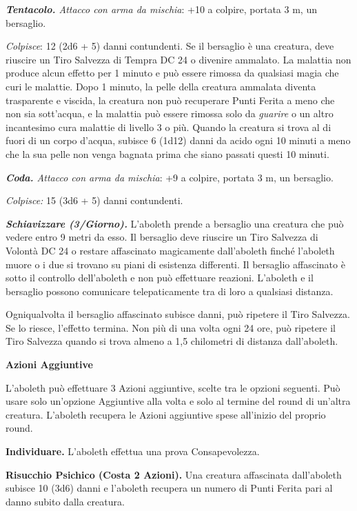 \begin{multicols}{2}
{\emph{\textbf{Tentacolo.} Attacco con arma da mischia}: +10 a colpire, portata 3 m, un bersaglio.

\emph{Colpisce}: 12 (2d6 + 5) danni contundenti. Se il bersaglio è una creatura, deve riuscire un Tiro Salvezza di Tempra DC 24 o divenire ammalato. La malattia non produce alcun effetto per 1 minuto e può essere rimossa da qualsiasi magia che curi le malattie. Dopo 1 minuto, la pelle della creatura ammalata diventa trasparente e viscida, la creatura non può recuperare Punti Ferita a meno che non sia sott'acqua, e la malattia può essere rimossa solo da \emph{guarire} o un altro incantesimo cura malattie di livello 3 o più. Quando la creatura si trova al di fuori di un corpo d'acqua, subisce 6 (1d12) danni da acido ogni 10 minuti a meno che la sua pelle non venga bagnata prima che siano passati questi 10 minuti.

\emph{\textbf{Coda.} Attacco con arma da mischia}: +9 a colpire, portata 3 m, un bersaglio.

\emph{Colpisce:} 15 (3d6 + 5) danni contundenti.

\emph{\textbf{Schiavizzare (3/Giorno).}} L'aboleth prende a bersaglio una creatura che può vedere entro 9 metri da esso. Il bersaglio deve riuscire un Tiro Salvezza di Volontà DC 24 o restare affascinato magicamente dall'aboleth finché l'aboleth muore o i due si trovano su piani di esistenza differenti. Il bersaglio affascinato è sotto il controllo dell'aboleth e non può effettuare reazioni. L'aboleth e il bersaglio possono comunicare telepaticamente tra di loro a qualsiasi distanza.

Ogniqualvolta il bersaglio affascinato subisce danni, può ripetere il Tiro Salvezza. Se lo riesce, l'effetto termina. Non più di una volta ogni 24 ore, può ripetere il Tiro Salvezza quando si trova almeno a 1,5 chilometri di distanza dall'aboleth.

\textbf{Azioni Aggiuntive}

L'aboleth può effettuare 3 Azioni aggiuntive, scelte tra le opzioni seguenti. Può usare solo un'opzione Aggiuntive alla volta e solo al termine del round di un'altra creatura. L'aboleth recupera le Azioni aggiuntive spese all'inizio del proprio round.

\textbf{Individuare.} L'aboleth effettua una prova Consapevolezza.

\textbf{Risucchio Psichico (Costa 2 Azioni).} Una creatura affascinata dall'aboleth subisce 10 (3d6) danni e l'aboleth recupera un numero di Punti Ferita pari al danno subito dalla creatura.

}
\end{multicols}
